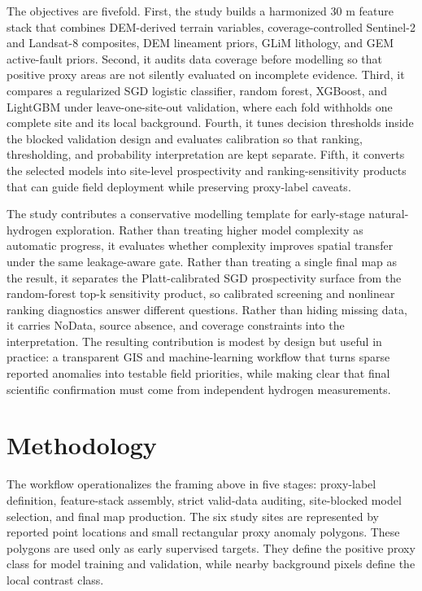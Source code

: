 \documentclass[numrefs]{interact}
\theoremstyle{plain}%
\theoremstyle{definition}
\theoremstyle{remark}
\begin{document}
The objectives are fivefold. First, the study builds a harmonized 30 m feature stack that combines DEM-derived terrain variables, coverage-controlled Sentinel-2 and Landsat-8 composites, DEM lineament priors, GLiM lithology, and GEM active-fault priors. Second, it audits data coverage before modelling so that positive proxy areas are not silently evaluated on incomplete evidence. Third, it compares a regularized SGD logistic classifier, random forest, XGBoost, and LightGBM under leave-one-site-out validation, where each fold withholds one complete site and its local background. Fourth, it tunes decision thresholds inside the blocked validation design and evaluates calibration so that ranking, thresholding, and probability interpretation are kept separate. Fifth, it converts the selected models into site-level prospectivity and ranking-sensitivity products that can guide field deployment while preserving proxy-label caveats.

The study contributes a conservative modelling template for early-stage natural-hydrogen exploration. Rather than treating higher model complexity as automatic progress, it evaluates whether complexity improves spatial transfer under the same leakage-aware gate. Rather than treating a single final map as the result, it separates the Platt-calibrated SGD prospectivity surface from the random-forest top-k sensitivity product, so calibrated screening and nonlinear ranking diagnostics answer different questions. Rather than hiding missing data, it carries NoData, source absence, and coverage constraints into the interpretation. The resulting contribution is modest by design but useful in practice: a transparent GIS and machine-learning workflow that turns sparse reported anomalies into testable field priorities, while making clear that final scientific confirmation must come from independent hydrogen measurements.

\section{Methodology}

The workflow operationalizes the framing above in five stages: proxy-label definition, feature-stack assembly, strict valid-data auditing, site-blocked model selection, and final map production. The six study sites are represented by reported point locations and small rectangular proxy anomaly polygons. These polygons are used only as early supervised targets. They define the positive proxy class for model training and validation, while nearby background pixels define the local contrast class.
\end{document}
